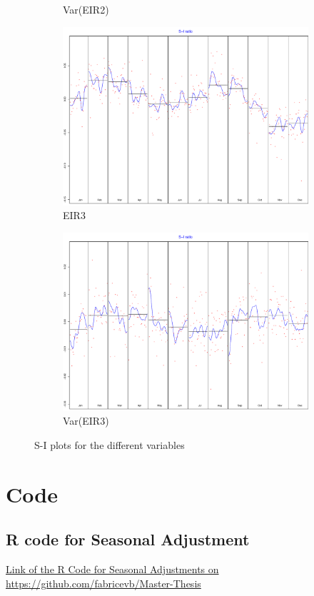 \documentclass[12pt,a4paper,oneside]{book}
\begin{document}
\begin{figure}
\begin{subfigure}{.5\textwidth}
  \caption{Var(EIR2)}
\end{subfigure}
\begin{subfigure}{.5\textwidth}
  \centering
  \includegraphics[width=.8\linewidth]{Graphs/S-I_7.pdf}
  \caption{EIR3}
\end{subfigure}
\begin{subfigure}{.5\textwidth}
  \centering
  \includegraphics[width=.8\linewidth]{Graphs/S-I_8.pdf}
  \caption{Var(EIR3)}
\end{subfigure}
\caption{S-I plots for the different variables}
\label{fig:S-I seasonal correction RJDemetra}
\end{figure}



\chapter*{Code}
\section*{R code for Seasonal Adjustment}
\href{https://github.com/fabricevb/Master-Thesis/blob/master/R/20Code/Seasonal/20Correction%20model%20data.R}{Link of the R Code for Seasonal Adjustments on https://github.com/fabricevb/Master-Thesis}
\end{document}
